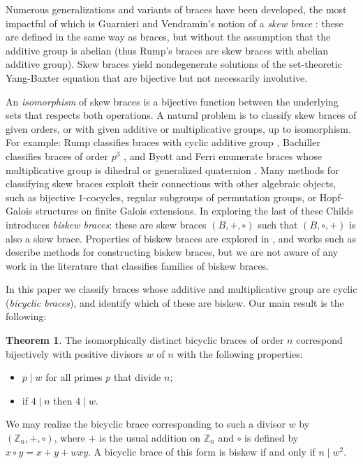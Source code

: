 \documentclass[reqno]{amsart}
\theoremstyle{definition}
\newtheorem{theorem}{Theorem}[section]
\newcommand{\Z}{\mathbb{Z}}
\begin{document}
Numerous generalizations and variants of braces have been developed, the most impactful of which is Guarnieri and Vendramin's notion of a \textit{skew brace} \cite{GV17}: these are defined in the same way as braces, but without the assumption that the additive group is abelian (thus Rump's braces are skew braces with abelian additive group). Skew braces yield nondegenerate solutions of the set-theoretic Yang-Baxter equation that are bijective but not necessarily involutive. 

An \textit{isomorphism} of skew braces is a bijective function between the underlying sets that respects both operations. A natural problem is to classify skew braces of given orders, or with given additive or multiplicative groups, up to isomorphism. For example: Rump classifies braces with cyclic additive group \cite{Ru07b}, Bachiller classifies braces of order $ p^{3} $ \cite{Ba15}, and Byott and Ferri enumerate braces whose multiplicative group is dihedral or generalized quaternion \cite{BF25}. Many methods for classifying skew braces exploit their connections with other algebraic objects, such as bijective $ 1 $-cocycles, regular subgroups of permutation groups, or Hopf-Galois structures on finite Galois extensions. In exploring the last of these Childs \cite{Ch19b} introduces \textit{biskew braces}: these are skew braces $ (B,+,\circ) $ such that $ (B,\circ,+) $ is also a skew brace. Properties of biskew braces are explored in \cite{ST23b}, and works such as \cite{Koc21a} describe methods for constructing biskew braces, but we are not aware of any work in the literature that classifies families of biskew braces.

In this paper we classify braces whose additive and multiplicative group are cyclic (\textit{bicyclic braces}), and identify which of these are biskew. Our main result is the following: 

\begin{theorem} \label{theorem_main}
The isomorphically distinct bicyclic braces of order $ n $ correspond bijectively with positive divisors $ w $ of $ n $ with the following properties:
\begin{itemize}
\item $ p \mid w $ for all primes $ p $ that divide $ n $;
\item if $ 4 \mid n $ then $ 4 \mid w $.
\end{itemize}
We may realize the bicyclic brace corresponding to such a divisor $ w $ by $ (\Z_{n},+,\circ) $, where $ + $ is the usual addition on $ \Z_{n} $ and $ \circ $ is defined by $ x \circ y = x + y + wxy $. A bicyclic brace of this form is biskew if and only if $ n \mid w^{2} $. 
\end{theorem}
\end{document}
